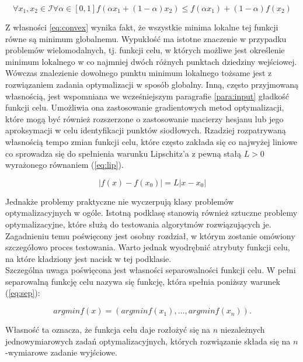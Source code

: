 \begin{equation}
\label{eq:convex}
    \forall{x_1, x_2 \in \mathcal{I}}\forall{\alpha \in [0, 1]}
    f(\alpha x_{1} + (1 - \alpha)x_{2}) \leq f(\alpha x_{1}) + (1 - \alpha)f(x_{2})
\end{equation}

Z własności \ref{eq:convex} wynika fakt, że wszystkie minima lokalne tej funkcji równe są minimum globalnemu. Wypukłość ma istotne znaczenie w przypadku problemów wielomodalnych, tj. funkcji celu, w których możliwe jest określenie minimum lokalnego w co najmniej dwóch różnych punktach dziedziny wejściowej. Wówczas znalezienie dowolnego punktu minimum lokalnego tożsame jest z rozwiązaniem zadania optymalizacji w sposób globalny. Inną, często przyjmowaną własnością, jest wspomniana we wcześniejszym paragrafie \ref{para:input} gładkość funkcji celu. Umożliwia ona zastosowanie gradientowych metod optymalizacji, które mogą być również rozszerzone o zastosowanie macierzy hesjanu lub jego aproksymacji w celu identyfikacji punktów siodłowych. Rzadziej rozpatrywaną własnością tempo zmian funkcji celu, które często zakłada się co najwyżej liniowe co sprowadza się do spełnienia warunku Lipschitz'a z pewną stałą $L > 0$ wyrażonego równaniem (\ref{eq:lip}). 

\begin{equation}
    \label{eq:lip}
    |f(x) - f(x_{0})| = L|x - x_{0}|
\end{equation}

Jednakże problemy praktyczne nie wyczerpują klasy problemów optymalizacyjnych w ogóle. Istotną podklasę stanowią również sztuczne problemy optymalizacyjne, które służą do testowania algorytmów rozwiązujących je. Zagadnieniu temu poświęcony jest osobny rozdział, w którym zostanie omówiony szczegółowo proces testowania. Warto jednak wyodrębnić atrybuty funkcji celu, na które kładziony jest nacisk w tej podklasie. \\
Szczególna uwaga poświęcona jest własności separowalności funkcji celu. W pełni separowalną funkcję celu nazywa się funkcję, która spełnia poniższy warunek (\ref{eq:sep}):

\begin{equation}
    \label{eq:sep}
    argmin f(x) = (argmin f(x_{1}), \dots, argmin f(x_{n})).
\end{equation}

Własność ta oznacza, że funkcja celu daje rozłożyć się na $n$ niezależnych jednowymiarowych zadań optymalizacyjnych, których rozwiązanie składa się na $n$-wymiarowe zadanie wyjściowe.


